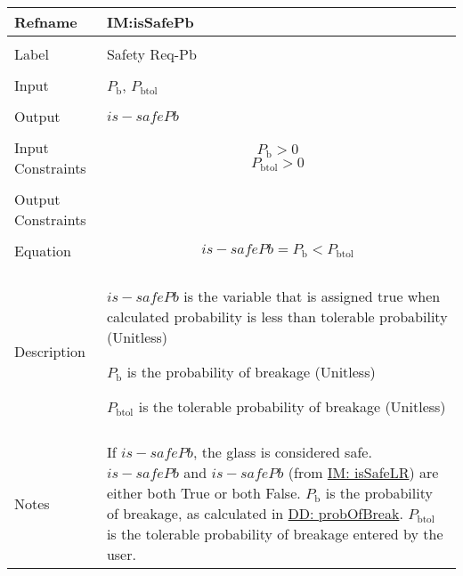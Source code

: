\documentclass[12pt]{article}
\begin{document}
\begin{minipage}{\textwidth}
\begin{tabular}{>{\raggedright}p{}>{\raggedright\arraybackslash}p{}}
\toprule \textbf{Refname} & \textbf{IM:isSafePb}
\label{IM:isSafePb}
\\ \midrule \\
Label & Safety Req-Pb
        
\\ \midrule \\
Input & ${P_{\text{b}}}$, ${P_{\text{b}\text{tol}}}$
        
\\ \midrule \\
Output & $is-safePb$
         
\\ \midrule \\
Input Constraints & \begin{displaymath}
                    {P_{\text{b}}}>0
                    \end{displaymath}
                    \begin{displaymath}
                    {P_{\text{b}\text{tol}}}>0
                    \end{displaymath}
\\ \midrule \\
Output Constraints & 
\\ \midrule \\
Equation & \begin{displaymath}
           is-safePb={P_{\text{b}}}<{P_{\text{b}\text{tol}}}
           \end{displaymath}
\\ \midrule \\
Description & \begin{symbDescription}
              \item{$is-safePb$ is the variable that is assigned true when calculated probability is less than tolerable probability (Unitless)}
              \item{${P_{\text{b}}}$ is the probability of breakage (Unitless)}
              \item{${P_{\text{b}\text{tol}}}$ is the tolerable probability of breakage (Unitless)}
              \end{symbDescription}
\\ \midrule \\
Notes & If $is-safePb$, the glass is considered safe. $is-safePb$ and $is-safePb$ (from \hyperref[IM:isSafeLR]{IM: isSafeLR}) are either both True or both False. ${P_{\text{b}}}$ is the probability of breakage, as calculated in \hyperref[DD:probOfBreak]{DD: probOfBreak}. ${P_{\text{b}\text{tol}}}$ is the tolerable probability of breakage entered by the user.
        

\end{tabular}
\end{minipage}
\end{document}
